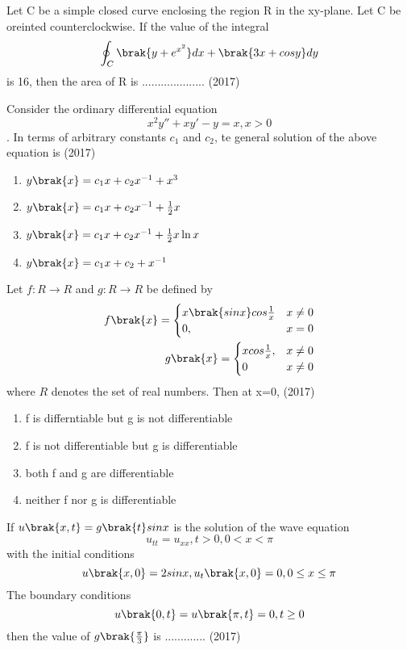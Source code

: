     \item[6.] Let C be a simple closed curve enclosing the region R in the xy-plane. Let C be oreinted counterclockwise. If the value of the integral $$\oint_C \brak{y+e^{x^2}}dx + \brak{3x+cosy}dy$$ is 16, then the area of R is .................... \hfill (2017)
    \item[7.] Consider the ordinary differential equation $$x^2y''+xy'-y=x, x>0$$. In terms of arbitrary constants $c_1$ and $c_2$, te general solution of the above equation is \hfill (2017)
    \begin{enumerate}[label = (\Alph*)]
        \item $y\brak{x} = c_1x+c_2x^{-1}+x^3$
        \item $y\brak{x} = c_1x+c_2x^{-1}+\frac{1}{2}x$
        \item $y\brak{x} = c_1x+c_2x^{-1}+\frac{1}{2}x\ln x$
        \item $y\brak{x} = c_1x+c_2+x^{-1}$
    \end{enumerate}
    \item[8.] Let $f:R\rightarrow R$ and $g:R\rightarrow R$ be defined by \begin{align*}f\brak{x}=\begin{cases}x\brak{sinx}cos\frac{1}{x} & x\neq 0\\0,&x=0\end{cases}\\g\brak{x}=\begin{cases}xcos\frac{1}{x},&x\neq 0\\0 &x\neq 0\end{cases}\end{align*} where $R$ denotes the set of real numbers. Then at x=0, \hfill (2017)
    \begin{enumerate}[label = (\Alph*)]
       \item f is differntiable but g is not differentiable
       \item f is not differentiable but g is differentiable
       \item both f and g are differentiable
       \item neither f nor g is differentiable
    \end{enumerate}
    \item[9.] If $u\brak{x,t} = g\brak{t}sinx$ is the solution of the wave equation\\$$u_{tt} = u_{xx}, t>0, 0<x<\pi$$ 
     with the initial conditions $$u\brak{x,0}=2sinx, u_t\brak{x,0}=0, 0\leq x\leq \pi$$ The boundary conditions $$u\brak{0,t}=u\brak{\pi,t}=0, t\geq 0$$then the value of $g\brak{\frac{\pi}{3}}$ is ............. \hfill (2017)
